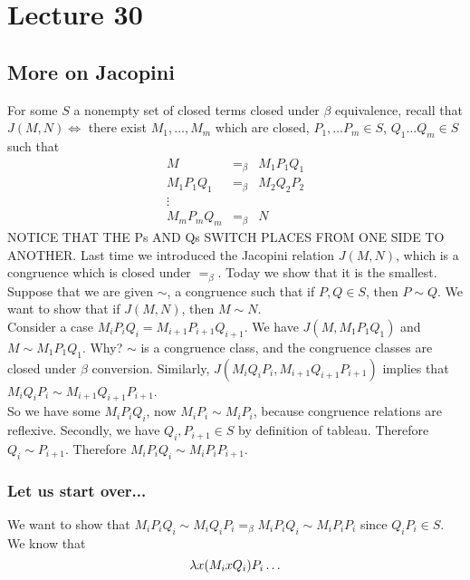 \chapter{Lecture 30}

\section{More on Jacopini}
For some $S$ a nonempty set of closed terms closed under $\beta$ equivalence, recall that $J(M,N) \Leftrightarrow$ there exist $M_1,\ldots,M_m$ which are closed, $P_1,\ldots P_m \in S$, $Q_1\ldots Q_m \in S$ such that
\begin{eqnarray*}
  M &=_\beta& M_1P_1Q_1\\
  M_1P_1Q_1 &=_\beta& M_2Q_2P_2\\
  \vdots\\
  M_mP_mQ_m &=_\beta& N
\end{eqnarray*}
NOTICE THAT THE Ps AND Qs SWITCH PLACES FROM ONE SIDE TO ANOTHER. 
Last time we introduced the Jacopini relation $J(M,N)$, which is a congruence which is closed under $=_\beta$. Today we show that it is the smallest.\\

Suppose that we are given $\sim$, a congruence such that if $P,Q \in S$, then $P \sim Q$. We want to show that if $J(M,N)$, then $M \sim N$.\\

Consider a case $M_iP_iQ_i = M_{i+1}P_{i+1}Q_{i+1}$. We have $J(M,M_1P_1Q_1)$ and $M \sim M_1P_1Q_1$. Why? $\sim$ is a congruence class, and the congruence classes are closed under $\beta$ conversion. Similarly, $J(M_iQ_iP_i,M_{i+1}Q_{i+1}P_{i+1})$ implies that $M_iQ_iP_i \sim M_{i+1}Q_{i+1}P_{i+1}$.\\

So we have some $M_iP_iQ_i$, now $M_iP_i \sim M_iP_i$, because congruence relations are reflexive. Secondly, we have $Q_i,P_{i+1} \in S$ by definition of tableau. Therefore $Q_i \sim P_{i+1}$. Therefore $M_iP_iQ_i \sim M_iP_iP_{i+1}$.

\subsection{Let us start over...}
We want to show that $M_iP_iQ_i \sim M_iQ_iP_i =_\beta M_iP_iQ_i \sim M_iP_iP_i$ since $Q_iP_i \in S$. We know that
\begin{equation*}
  \lambda x(M_i x Q_i)P_i\ldots
\end{equation*}

